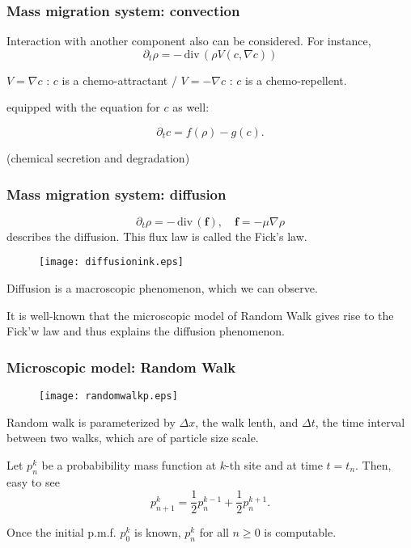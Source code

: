 \documentclass{beamer}
\def\red{\color{red}}
\def\blue{\color{blue}}
\def\div{\,\textrm{div}\,}
\begin{document}
\begin{frame}
 \frametitle{Mass migration system: convection}
 Interaction with another component also can be considered. For instance, %
 $$ \partial_t \rho = -\div( \rho V(c,\nabla c) )$$

 $V = \nabla c$ : $c$ is a chemo-attractant \: / \:  
 $V = -\nabla c$ : $c$ is a chemo-repellent.
 
equipped with the equation for $c$ as well:

$$\partial_t c = f(\rho) - g(c).$$

(chemical secretion and degradation)
\end{frame}

\begin{frame}
 \frametitle{Mass migration system: diffusion}
    \begin{minipage}{0.6\linewidth}
        $$\partial_t \rho = - \div( \mathbf{f}), \quad \mathbf{f} = -\mu \nabla \rho$$
        describes the diffusion. This flux law is called the Fick's law.
    \end{minipage}
    \begin{minipage}{0.3\linewidth}
    \hfill
    \begin{figure}
    \centering
    \texttt{[image: diffusionink.eps]}
    \end{figure}
    \end{minipage}    
    Diffusion is a {\blue macroscopic} phenomenon, which we can observe.
    
    It is well-known that the {\blue microscopic model of} {\red Random Walk} gives rise to the Fick'w law and thus explains the diffusion phenomenon.

\end{frame}

\begin{frame}
 \frametitle{Microscopic model: Random Walk}

    \begin{figure}
    \centering
    \texttt{[image: randomwalkp.eps]}
    \end{figure}
  
    Random walk is parameterized by $\Delta x$, the walk lenth, and $\Delta t$, the time interval between two walks, which are of particle size scale.
    
    Let $p^k_n$ be a probabibility mass function at $k$-th site and at time $t=t_n$. Then, easy to see 
    $$ p^k_{n+1} = \frac{1}{2}p^{k-1}_{n} + \frac{1}{2}p^{k+1}_n.$$
    
    Once the initial p.m.f. $p^k_0$ is known, $p^k_n$ for all $n\ge0$ is computable.
\end{frame}
\end{document}
